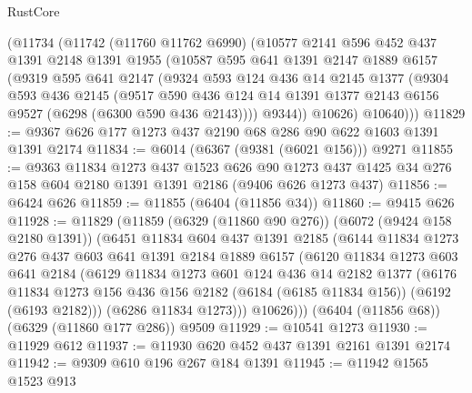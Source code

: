\begin{lexlean}{RustCore}
\begin{coremodule}
    (@11734
      (@11742
        (@11760 @11762 @6990)
        (@10577
          @2141
          @596
          @452
          @437
          @1391
          @2148
          @1391
          @1955
          (@10587
            @595
            @641
            @1391
            @2147
            @1889
            @6157
            (@9319
              @595
              @641
              @2147
              (@9324
                @593
                @124
                @436
                @14
                @2145
                @1377
                (@9304
                  @593
                  @436
                  @2145
                  (@9517
                    @590
                    @436
                    @124
                    @14
                    @1391
                    @1377
                    @2143
                    @6156
                    @9527
                    (@6298 (@6300 @590 @436 @2143))))
                @9344))
            @10626)
          @10640)))
@11829 := @9367 @626 @177 @1273 @437 @2190 @68 @286 @90 @622 @1603 @1391 @1391 @2174
@11834 := @6014 (@6367 (@9381 (@6021 @156))) @9271
@11855 := @9363
    @11834
    @1273
    @437
    @1523
    @626
    @90
    @1273
    @437
    @1425
    @34
    @276
    @158
    @604
    @2180
    @1391
    @1391
    @2186
    (@9406 @626 @1273 @437)
@11856 := @6424 @626
@11859 := @11855 (@6404 (@11856 @34))
@11860 := @9415 @626
@11928 := @11829
    (@11859
      (@6329 (@11860 @90 @276))
      (@6072 (@9424 @158 @2180 @1391))
      (@6451
        @11834
        @604
        @437
        @1391
        @2185
        (@6144
          @11834
          @1273
          @276
          @437
          @603
          @641
          @1391
          @2184
          @1889
          @6157
          (@6120
            @11834
            @1273
            @603
            @641
            @2184
            (@6129
              @11834
              @1273
              @601
              @124
              @436
              @14
              @2182
              @1377
              (@6176
                @11834
                @1273
                @156
                @436
                @156
                @2182
                (@6184 (@6185 @11834 @156))
                (@6192 (@6193 @2182)))
              (@6286 @11834 @1273)))
          @10626)))
    (@6404 (@11856 @68))
    (@6329 (@11860 @177 @286))
    @9509
@11929 := @10541 @1273
@11930 := @11929 @612
@11937 := @11930 @620 @452 @437 @1391 @2161 @1391 @2174
@11942 := @9309 @610 @196 @267 @184 @1391
@11945 := @11942 @1565 @1523 @913

\end{coremodule}
\end{lexlean}
